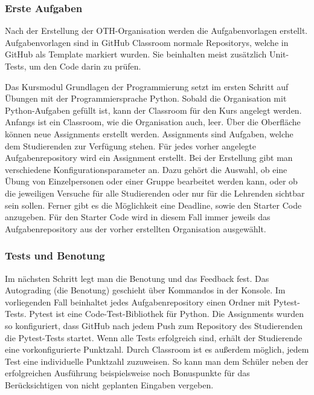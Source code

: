 \subsubsection{Erste Aufgaben}\label{classroom-erste-aufgaben}
Nach der Erstellung der OTH-Organisation werden die Aufgabenvorlagen erstellt.
Aufgabenvorlagen sind in GitHub Classroom normale Repositorys, welche in GitHub
als Template markiert wurden. Sie beinhalten meist zusätzlich Unit-Tests, um den
Code darin zu prüfen.

Das Kursmodul \glqq Grundlagen der Programmierung\grqq{} setzt im ersten Schritt
auf Übungen mit der Programmiersprache Python. Sobald die Organisation mit
Python-Aufgaben gefüllt ist, kann der Classroom für den Kurs angelegt werden.
Anfangs ist ein Classroom, wie die Organisation auch, leer. Über die Oberfläche
können neue Assignments erstellt werden. Assignments sind Aufgaben, welche dem
Studierenden zur Verfügung stehen. Für jedes vorher angelegte Aufgabenrepository
wird ein Assignment erstellt. Bei der Erstellung gibt man verschiedene
Konfigurationsparameter an. Dazu gehört die Auswahl, ob eine Übung von
Einzelpersonen oder einer Gruppe bearbeitet werden kann, oder ob die jeweiligen
Versuche für alle Studierenden oder nur für die Lehrenden sichtbar sein sollen.
Ferner gibt es die Möglichkeit eine Deadline, sowie den Starter Code anzugeben.
Für den Starter Code wird in diesem Fall immer jeweils das Aufgabenrepository
aus der vorher erstellten Organisation ausgewählt.
\parencite{github-assignment-erstellen}

\subsubsection{Tests und Benotung}\label{classroom-tests}
Im nächsten Schritt legt man die Benotung und das Feedback fest. Das Autograding
(die Benotung) geschieht über Kommandos in der Konsole. Im vorliegenden Fall
beinhaltet jedes Aufgabenrepository einen Ordner mit Pytest-Tests. Pytest ist
eine Code-Test-Bibliothek für Python. Die Assignments wurden so konfiguriert,
dass GitHub nach jedem Push zum Repository des Studierenden die Pytest-Tests
startet. Wenn alle Tests erfolgreich sind, erhält der Studierende eine
vorkonfigurierte Punktzahl. Durch Classroom ist es außerdem möglich, jedem Test
eine individuelle Punktzahl zuzuweisen. So kann man dem Schüler neben der
erfolgreichen Ausführung beispielsweise noch Bonuspunkte für das Berücksichtigen
von nicht geplanten Eingaben vergeben. \parencite{github-assignment-erstellen}

